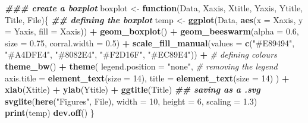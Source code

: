 \documentclass[
]{article}
\newenvironment{Shaded}{\begin{snugshade}}{\end{snugshade}}
\newcommand{\AttributeTok}[1]{\textcolor[rgb]{0.13,0.29,0.53}{#1}}
\newcommand{\CommentTok}[1]{\textcolor[rgb]{0.56,0.35,0.01}{\textit{#1}}}
\newcommand{\ControlFlowTok}[1]{\textcolor[rgb]{0.13,0.29,0.53}{\textbf{#1}}}
\newcommand{\DecValTok}[1]{\textcolor[rgb]{0.00,0.00,0.81}{#1}}
\newcommand{\DocumentationTok}[1]{\textcolor[rgb]{0.56,0.35,0.01}{\textbf{\textit{#1}}}}
\newcommand{\FloatTok}[1]{\textcolor[rgb]{0.00,0.00,0.81}{#1}}
\newcommand{\FunctionTok}[1]{\textcolor[rgb]{0.13,0.29,0.53}{\textbf{#1}}}
\newcommand{\NormalTok}[1]{#1}
\newcommand{\OtherTok}[1]{\textcolor[rgb]{0.56,0.35,0.01}{#1}}
\newcommand{\SpecialCharTok}[1]{\textcolor[rgb]{0.81,0.36,0.00}{\textbf{#1}}}
\newcommand{\StringTok}[1]{\textcolor[rgb]{0.31,0.60,0.02}{#1}}
\begin{document}
\begin{Shaded}
\begin{Highlighting}[]
\DocumentationTok{\#\#\# create a boxplot}
\NormalTok{boxplot }\OtherTok{\textless{}{-}} \ControlFlowTok{function}\NormalTok{(Data, Xaxis, Xtitle, Yaxis, Ytitle, Title, File)\{}
  \DocumentationTok{\#\# defining the boxplot}
\NormalTok{  temp }\OtherTok{\textless{}{-}} \FunctionTok{ggplot}\NormalTok{(Data, }\FunctionTok{aes}\NormalTok{(}\AttributeTok{x =}\NormalTok{ Xaxis, }\AttributeTok{y =}\NormalTok{ Yaxis, }\AttributeTok{fill =}\NormalTok{ Xaxis)) }\SpecialCharTok{+}
    \FunctionTok{geom\_boxplot}\NormalTok{() }\SpecialCharTok{+}
    \FunctionTok{geom\_beeswarm}\NormalTok{(}\AttributeTok{alpha =} \FloatTok{0.6}\NormalTok{, }\AttributeTok{size =} \FloatTok{0.75}\NormalTok{, }\AttributeTok{corral.width =} \FloatTok{0.5}\NormalTok{) }\SpecialCharTok{+}
    \FunctionTok{scale\_fill\_manual}\NormalTok{(}\AttributeTok{values =} \FunctionTok{c}\NormalTok{(}\StringTok{"\#E89494"}\NormalTok{, }\StringTok{"\#A4DFE4"}\NormalTok{, }\StringTok{"\#8082E4"}\NormalTok{,}
                                 \StringTok{"\#F2D16F"}\NormalTok{, }\StringTok{"\#EC89E4"}\NormalTok{)) }\SpecialCharTok{+} \CommentTok{\# defining colours}
    \FunctionTok{theme\_bw}\NormalTok{() }\SpecialCharTok{+}
    \FunctionTok{theme}\NormalTok{(}
      \AttributeTok{legend.position =} \StringTok{"none"}\NormalTok{, }\CommentTok{\# removing the legend}
      \AttributeTok{axis.title =} \FunctionTok{element\_text}\NormalTok{(}\AttributeTok{size =} \DecValTok{14}\NormalTok{),}
      \AttributeTok{title =} \FunctionTok{element\_text}\NormalTok{(}\AttributeTok{size =} \DecValTok{14}\NormalTok{)}
\NormalTok{    ) }\SpecialCharTok{+}
    \FunctionTok{xlab}\NormalTok{(Xtitle) }\SpecialCharTok{+}
    \FunctionTok{ylab}\NormalTok{(Ytitle) }\SpecialCharTok{+}
    \FunctionTok{ggtitle}\NormalTok{(Title)}
  \DocumentationTok{\#\# saving as a .svg}
  \FunctionTok{svglite}\NormalTok{(}\FunctionTok{here}\NormalTok{(}\StringTok{"Figures"}\NormalTok{, File), }\AttributeTok{width =} \DecValTok{10}\NormalTok{,}
          \AttributeTok{height =} \DecValTok{6}\NormalTok{,}
          \AttributeTok{scaling =} \FloatTok{1.3}\NormalTok{)}
  \FunctionTok{print}\NormalTok{(temp)}
  \FunctionTok{dev.off}\NormalTok{()}
\NormalTok{\}}
\end{Highlighting}
\end{Shaded}
\end{document}
